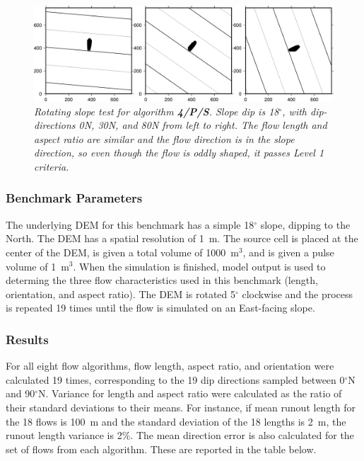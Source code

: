 \documentclass[12pt,letter]{article}
\begin{document}
		\begin{figure}[h!]
			\centering
			\includegraphics[width=\linewidth]{figures/lava_C_4N_slope}
			\caption{\textit{Rotating slope test for algorithm \textbf{4/P/S}. Slope dip is 18$^{\circ}$, with dip-directions 0N, 30N, and 80N from left to right. The flow length and aspect ratio are similar and the flow direction is in the slope direction, so even though the flow is oddly shaped, it passes Level 1 criteria.}}
			\label{fig:slope}
		\end{figure}
		
		\subsubsection{Benchmark Parameters} The underlying DEM for this benchmark has a simple 18$^{\circ}$ slope, dipping to the North. The DEM has a spatial resolution of 1~m. The source cell is placed at the center of the DEM, is given a total volume of 1000~m$^3$, and is given a pulse volume of 1~m$^3$. When the simulation is finished, model output is used to determing the three flow characteristics used in this benchmark (length, orientation, and aspect ratio). The DEM is rotated 5$^{\circ}$ clockwise and the process is repeated 19 times until the flow is simulated on an East-facing slope.
		
		
		
		\subsubsection{Results}

		For all eight flow algorithms, flow length, aspect ratio, and orientation were calculated 19 times, corresponding to the 19 dip directions sampled between 0$^{\circ}$N and 90$^{\circ}$N. Variance for length and aspect ratio were calculated as the ratio of their standard deviations to their means. For instance, if mean runout length for the 18 flows is 100~m and the standard deviation of the 18 lengths is 2~m, the runout length variance is 2\%. The mean direction error is also calculated for the set of flows from each algorithm. These are reported in the table below.
\end{document}
